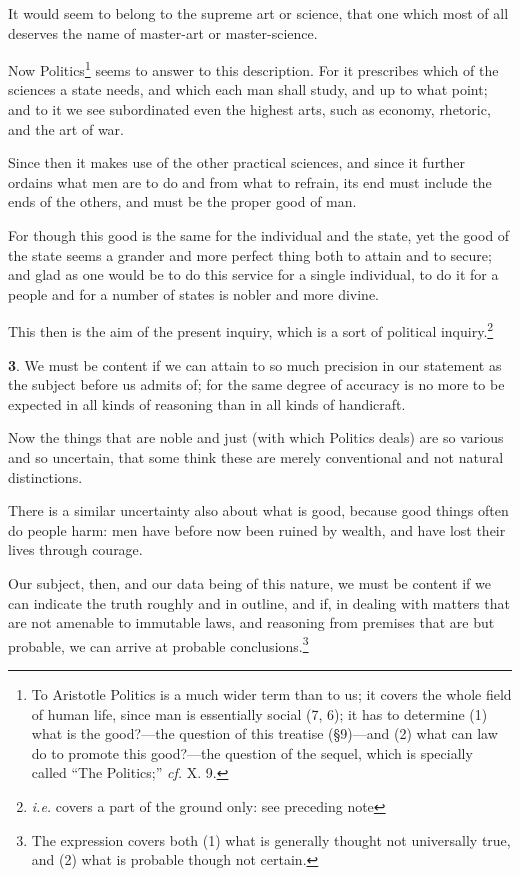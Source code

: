 It would seem to belong to the supreme art or science, that one which
most of all deserves the name of master-art or master-science.

Now Politics\footnote{To Aristotle Politics is a much wider term than
to us; it covers the whole field of human life, since man is
essentially social (7, 6); it has to determine (1) what is the
good?---the question of this treatise (\S9)---and (2) what can law do
to promote this good?---the question of the sequel, which is specially
called ``The Politics;'' \textit{cf.} X. 9.} seems to answer to this
description.  For it prescribes which of the sciences a state
needs, and which each man shall study, and up to what point; and to it
we see subordinated even the highest arts, such as economy, rhetoric,
and the art of war.

Since then it makes use of the other practical sciences, and since it
further ordains what men are to do and from what to refrain, its end
must include the ends of the others, and must be the proper good of
man.

For though this good is the same for the individual and the state, yet
the good of the state seems a grander and more perfect thing both to
attain and to secure; and glad as one would be to do this service for
a single individual, to do it for a people and for a number of states
is nobler and more divine.

This then is the aim of the present inquiry, which is a sort of
political inquiry.\footnote{\textit{i.e.} covers a part of the ground
only: see preceding note}

\textbf{3}. We must be content if we can attain to so much precision
in our statement as the subject before us admits of; for the same
degree of accuracy is no more to be expected in all kinds of reasoning
than in all kinds of handicraft.

Now the things that are noble and just (with which Politics deals) are
so various and so uncertain, that some think these are merely
conventional and not natural distinctions.

There is a similar uncertainty also about what is good, because good
things often do people harm: men have before now been ruined by
wealth, and have lost their lives through courage.

Our subject, then, and our data being of this  nature, we must
be content if we can indicate the truth roughly and in outline, and
if, in dealing with matters that are not amenable to immutable laws,
and reasoning from premises that are but probable, we can arrive at
probable conclusions.\footnote{The expression 
covers both (1) what is generally thought not universally true, and
(2) what is probable though not certain.}

